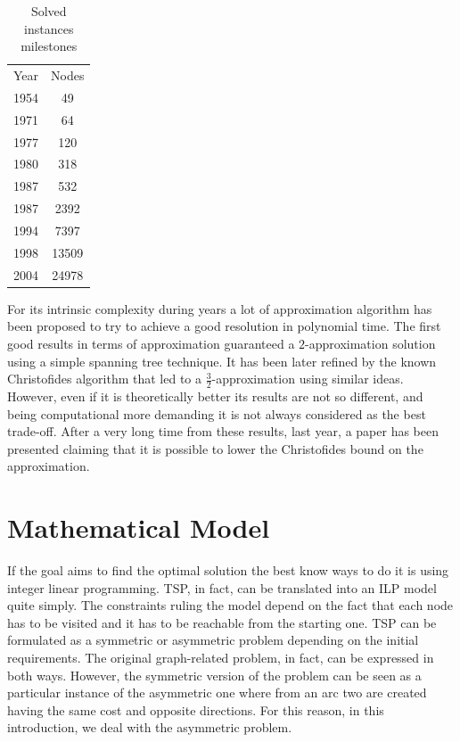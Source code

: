 \begin{table}[H] 
    \centering 
    \begin{tabular}{c|c}
        Year & Nodes \\
        1954 & 49 \\
        1971 & 64 \\
        1977 & 120 \\
        1980 & 318 \\
        1987 & 532 \\
        1987 & 2392 \\
        1994 & 7397 \\
        1998 & 13509 \\
        2004 & 24978 
    \end{tabular} 
    \caption{Solved instances milestones} 
\end{table}

For its intrinsic complexity during years a lot of approximation algorithm has
been proposed to try to achieve a good resolution in polynomial time. The first
good results in terms of approximation guaranteed a $2$-approximation solution
using a simple spanning tree technique. It has been later refined by the known
Christofides algorithm that led to a $\frac{3}{2}$-approximation using similar
ideas. However, even if it is theoretically better its results are not so
different, and being computational more demanding it is not always considered
as the best trade-off. After a very long time from these results, last year, a
paper has been presented claiming that it is possible to lower the Christofides
bound on the approximation.

\section{Mathematical Model}

If the goal aims to find the optimal solution the best know ways to do it is
using integer linear programming. TSP, in fact, can be translated into an ILP
model quite simply. The constraints ruling the model depend on the fact that
each node has to be visited and it has to be reachable from the starting one.
TSP can be formulated as a symmetric or asymmetric problem depending on the
initial requirements. The original graph-related problem, in fact, can be
expressed in both ways. However, the symmetric version of the problem can be
seen as a particular instance of the asymmetric one where from an arc two are
created having the same cost and opposite directions. For this reason, in this
introduction, we deal with the asymmetric problem.

